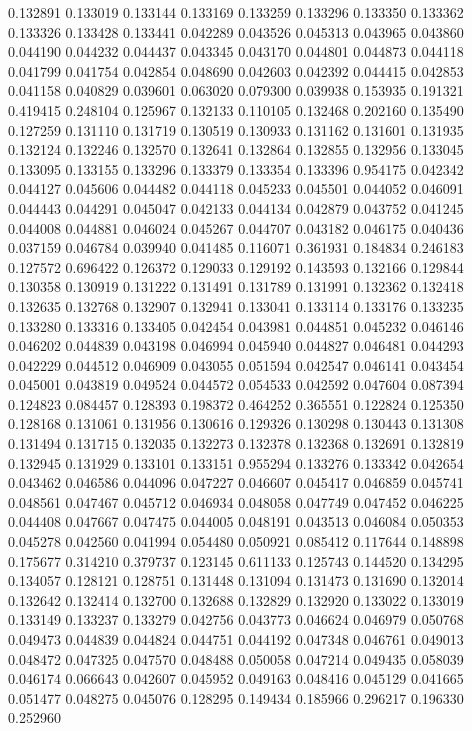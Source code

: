 0.132891
0.133019
0.133144
0.133169
0.133259
0.133296
0.133350
0.133362
0.133326
0.133428
0.133441
0.042289
0.043526
0.045313
0.043965
0.043860
0.044190
0.044232
0.044437
0.043345
0.043170
0.044801
0.044873
0.044118
0.041799
0.041754
0.042854
0.048690
0.042603
0.042392
0.044415
0.042853
0.041158
0.040829
0.039601
0.063020
0.079300
0.039938
0.153935
0.191321
0.419415
0.248104
0.125967
0.132133
0.110105
0.132468
0.202160
0.135490
0.127259
0.131110
0.131719
0.130519
0.130933
0.131162
0.131601
0.131935
0.132124
0.132246
0.132570
0.132641
0.132864
0.132855
0.132956
0.133045
0.133095
0.133155
0.133296
0.133379
0.133354
0.133396
0.954175
0.042342
0.044127
0.045606
0.044482
0.044118
0.045233
0.045501
0.044052
0.046091
0.044443
0.044291
0.045047
0.042133
0.044134
0.042879
0.043752
0.041245
0.044008
0.044881
0.046024
0.045267
0.044707
0.043182
0.046175
0.040436
0.037159
0.046784
0.039940
0.041485
0.116071
0.361931
0.184834
0.246183
0.127572
0.696422
0.126372
0.129033
0.129192
0.143593
0.132166
0.129844
0.130358
0.130919
0.131222
0.131491
0.131789
0.131991
0.132362
0.132418
0.132635
0.132768
0.132907
0.132941
0.133041
0.133114
0.133176
0.133235
0.133280
0.133316
0.133405
0.042454
0.043981
0.044851
0.045232
0.046146
0.046202
0.044839
0.043198
0.046994
0.045940
0.044827
0.046481
0.044293
0.042229
0.044512
0.046909
0.043055
0.051594
0.042547
0.046141
0.043454
0.045001
0.043819
0.049524
0.044572
0.054533
0.042592
0.047604
0.087394
0.124823
0.084457
0.128393
0.198372
0.464252
0.365551
0.122824
0.125350
0.128168
0.131061
0.131956
0.130616
0.129326
0.130298
0.130443
0.131308
0.131494
0.131715
0.132035
0.132273
0.132378
0.132368
0.132691
0.132819
0.132945
0.131929
0.133101
0.133151
0.955294
0.133276
0.133342
0.042654
0.043462
0.046586
0.044096
0.047227
0.046607
0.045417
0.046859
0.045741
0.048561
0.047467
0.045712
0.046934
0.048058
0.047749
0.047452
0.046225
0.044408
0.047667
0.047475
0.044005
0.048191
0.043513
0.046084
0.050353
0.045278
0.042560
0.041994
0.054480
0.050921
0.085412
0.117644
0.148898
0.175677
0.314210
0.379737
0.123145
0.611133
0.125743
0.144520
0.134295
0.134057
0.128121
0.128751
0.131448
0.131094
0.131473
0.131690
0.132014
0.132642
0.132414
0.132700
0.132688
0.132829
0.132920
0.133022
0.133019
0.133149
0.133237
0.133279
0.042756
0.043773
0.046624
0.046979
0.050768
0.049473
0.044839
0.044824
0.044751
0.044192
0.047348
0.046761
0.049013
0.048472
0.047325
0.047570
0.048488
0.050058
0.047214
0.049435
0.058039
0.046174
0.066643
0.042607
0.045952
0.049163
0.048416
0.045129
0.041665
0.051477
0.048275
0.045076
0.128295
0.149434
0.185966
0.296217
0.196330
0.252960
